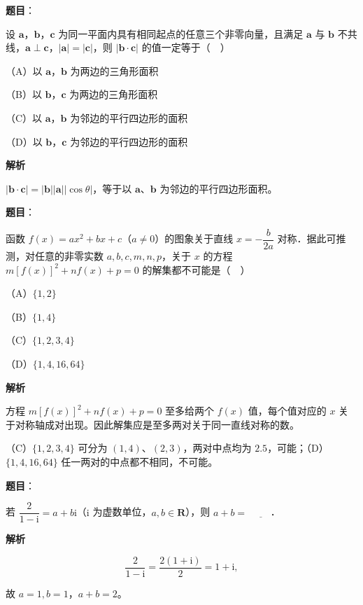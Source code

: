 \begin{answer}

\textbf{题目}：

设 $\boldsymbol a$，$\boldsymbol b$，$\boldsymbol c$ 为同一平面内具有相同起点的任意三个非零向量，且满足 $\boldsymbol a$ 与 $\boldsymbol b$ 不共线，$\boldsymbol a\perp\boldsymbol c$，$|\boldsymbol a|=|\boldsymbol c|$，则 $|\boldsymbol b\cdot\boldsymbol c|$ 的值一定等于（　）

（A）以 $\boldsymbol a$，$\boldsymbol b$ 为两边的三角形面积

（B）以 $\boldsymbol b$，$\boldsymbol c$ 为两边的三角形面积

（C）以 $\boldsymbol a$，$\boldsymbol b$ 为邻边的平行四边形的面积

（D）以 $\boldsymbol b$，$\boldsymbol c$ 为邻边的平行四边形的面积

\textbf{解析}

$|\boldsymbol b\cdot\boldsymbol c|=|\boldsymbol b||\boldsymbol a||\cos\theta|$，等于以 $\boldsymbol a$、$\boldsymbol b$ 为邻边的平行四边形面积。


\end{answer}
\begin{answer}

\textbf{题目}：

函数 $f(x)=ax^2+bx+c$（$a\neq0$）的图象关于直线 $x=-\dfrac b{2a}$ 对称．据此可推测，对任意的非零实数 $a,b,c,m,n,p$，关于 $x$ 的方程 $m[f(x)]^2+nf(x)+p=0$ 的解集都不可能是（　）

（A）$\{1,2\}$

（B）$\{1,4\}$

（C）$\{1,2,3,4\}$

（D）$\{1,4,16,64\}$

\textbf{解析}

方程 $m[f(x)]^2+nf(x)+p=0$ 至多给两个 $f(x)$ 值，每个值对应的 $x$ 关于对称轴成对出现。因此解集应是至多两对关于同一直线对称的数。

（C）$\{1,2,3,4\}$ 可分为 $(1,4)$、$(2,3)$，两对中点均为 $2.5$，可能；（D）$\{1,4,16,64\}$ 任一两对的中点都不相同，不可能。


\end{answer}
\begin{answer}

\textbf{题目}：

若 $\dfrac2{1-\mathrm i}=a+b\mathrm i$（$\mathrm i$ 为虚数单位，$a,b\in\mathbf R$），则 $a+b=$ $\underline{\qquad}$．

\textbf{解析}

\nopagebreak[4]
\[\frac2{1-\mathrm i}=\frac{2(1+\mathrm i)}2=1+\mathrm i,\]

故 $a=1,b=1$，$a+b=2$。


\end{answer}
